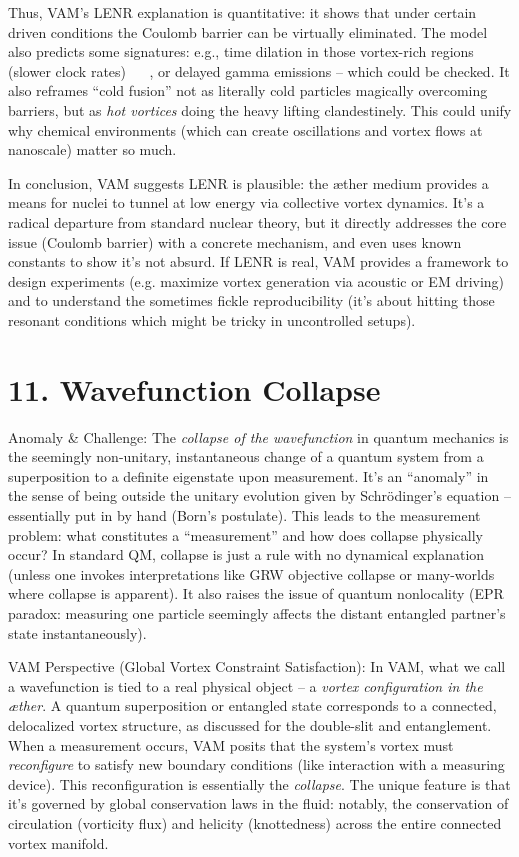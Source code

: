 \documentclass[a4paper, aps,preprint,superscriptaddress, 12pt]{revtex4}
\begin{document}
Thus, VAM’s LENR explanation is quantitative: it shows that under certain driven conditions the Coulomb barrier can be virtually eliminated. The model also predicts some signatures: e.g., time dilation in those vortex-rich regions (slower clock rates)~\cite{Iskandarani2025a} ~\cite{Iskandarani2025a} , or delayed gamma emissions – which could be checked. It also reframes “cold fusion” not as literally cold particles magically overcoming barriers, but as \textit{hot vortices} doing the heavy lifting clandestinely. This could unify why chemical environments (which can create oscillations and vortex flows at nanoscale) matter so much.


In conclusion, VAM suggests LENR is plausible: the æther medium provides a means for nuclei to tunnel at low energy via collective vortex dynamics. It’s a radical departure from standard nuclear theory, but it directly addresses the core issue (Coulomb barrier) with a concrete mechanism, and even uses known constants to show it’s not absurd. If LENR is real, VAM provides a framework to design experiments (e.g. maximize vortex generation via acoustic or EM driving)~\cite{Iskandarani2025a}  and to understand the sometimes fickle reproducibility (it’s about hitting those resonant conditions which might be tricky in uncontrolled setups).


\section*{11. Wavefunction Collapse}

Anomaly \& Challenge: The \textit{collapse of the wavefunction} in quantum mechanics is the seemingly non-unitary, instantaneous change of a quantum system from a superposition to a definite eigenstate upon measurement. It’s an “anomaly” in the sense of being outside the unitary evolution given by Schrödinger’s equation – essentially put in by hand (Born’s postulate). This leads to the measurement problem: what constitutes a “measurement” and how does collapse physically occur? In standard QM, collapse is just a rule with no dynamical explanation (unless one invokes interpretations like GRW objective collapse or many-worlds where collapse is apparent). It also raises the issue of quantum nonlocality (EPR paradox: measuring one particle seemingly affects the distant entangled partner’s state instantaneously).


VAM Perspective (Global Vortex Constraint Satisfaction): In VAM, what we call a wavefunction is tied to a real physical object – a \textit{vortex configuration in the æther}. A quantum superposition or entangled state corresponds to a connected, delocalized vortex structure, as discussed for the double-slit and entanglement. When a measurement occurs, VAM posits that the system’s vortex must \textit{reconfigure} to satisfy new boundary conditions (like interaction with a measuring device). This reconfiguration is essentially the \textit{collapse}. The unique feature is that it’s governed by global conservation laws in the fluid: notably, the conservation of circulation (vorticity flux) and helicity (knottedness) across the entire connected vortex manifold.
\end{document}
